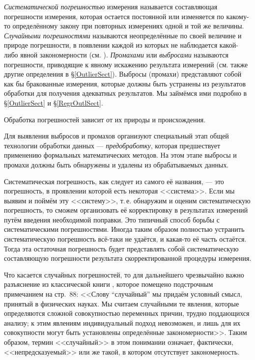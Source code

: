 \documentclass[a5paper,openany]{book}
\begin{document}
\emph{Систематической погрешностью} измерения называется составляющая погрешности 
измерения, которая остается постоянной или изменяется по какому-то определённому 
закону при повторных измерениях одной и той же величины. \emph{Случайными погрешностями} 
называются неопределённые по своей величине и природе погрешности, в появлении каждой 
из которых не наблюдается какой-либо явной закономерности (см. \cite{Malikov}). 
\emph{Промахами} или \emph{выбросами} называются погрешности, приводящие к явному 
искажению результата измерений (см. также другие определения в \S\ref{OutlierSect}). 
Выбросы (промахи) представляют собой как бы бракованные измерения, которые должны 
быть устранены из результатов обработки для получения адекватных результатов. 
Мы займёмся ими подробно в \S\ref{OutlierSect} и \S\ref{RegrOutlSect}. 
  
Обработка погрешностей зависит от их природы и происхождения. 
  
Для выявления выбросов и промахов организуют специальный этап общей технологии 
обработки данных --- \emph{предобработку}, которая предшествует применению формальных 
математических методов. На этом этапе выбросы и промахи должны быть обнаружены и 
удалены из обрабатываемых данных.                
   
Систематическая погрешность, как следует из самого её названия, --- это погрешность, 
в проявлении которой есть некоторая <<система>>. Если мы выявим и поймём эту <<систему>>, 
т.\,е. обнаружим и оценим систематическую погрешность, то сможем организовать её 
корректировку в результатах измерений путём введения необходимой поправки. Это типичный 
способ борьбы с систематическими погрешностями. Иногда таким образом полностью устранить 
систематическую погрешность всё-таки не удаётся, и какая-то её часть остаётся. Тогда эта 
остаточная погрешность будет представлять собой систематическую составляющую погрешности 
результата скорректированной процедуры измерения. 
  
Что касается случайных погрешностей, то для дальнейшего чрезвычайно важно разъяснение 
из классической книги \cite{Malikov}, которое помещено подстрочным примечанием на 
стр.~88: <<Слову ``случайный'' мы придаём условный смысл, принятый в физических науках. 
Мы считаем случайными те явления, которые определяются сложной совокупностью переменных 
причин, трудно поддающихся анализу; к этим явлениям индивидуальный подход невозможен, 
и лишь для их совокупности могут быть установлены определённые закономерности>>. 
Таким образом, термин <<случайный>> в этом понимании означает, фактически, 
<<непредсказуемый>> или же такой, в котором  отсутствует закономерность. 
      
\end{document}

